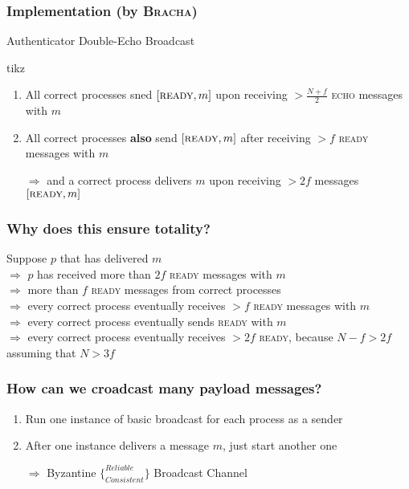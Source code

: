 \documentclass{article}
\begin{document}
\begin{adjustwidth}{2em}{2em}
\begin{adjustwidth}{2em}{2em}
			\subsubsection{Implementation (by \textsc{Bracha})}
			\begin{adjustwidth}{2em}{}
				Authenticator Double-Echo Broadcast
				\begin{center}
					tikz
				\end{center}
				\begin{enumerate}[-]
					\item All correct processes sned $[\textsc{ready}, m]$ upon receiving $> \frac{N+f}{2}$ \textsc{echo} messages with $m$
					\item All correct processes \textbf{also} send $[\textsc{ready}, m]$ after receiving $> f$ \textsc{ready} messages with $m$
					\item[$\Rightarrow$] and a correct process delivers $m$ upon receiving $> 2f$ messages $[\textsc{ready}, m]$
				\end{enumerate}
			\end{adjustwidth}
			\subsubsection{Why does this ensure totality?}
			\begin{adjustwidth}{2em}{}
				Suppose $p$ that has delivered $m$ \\
				$\Rightarrow$ $p$ has received more than $2f$ \textsc{ready} messages with $m$ \\
				$\Rightarrow$ more than $f$ \textsc{ready} messages from correct processes \\
				$\Rightarrow$ every correct process eventually receives $>f$ \textsc{ready} messages with $m$ \\
				$\Rightarrow$ every correct process eventually sends \textsc{ready} with $m$ \\
				$\Rightarrow$ every correct process eventually receives $>2f$ \textsc{ready}, because $N-f > 2f$ assuming that $N > 3f$
			\end{adjustwidth}
			\subsubsection{How can we croadcast many payload messages?}
			\begin{adjustwidth}{2em}{}
				\begin{enumerate}[-]
					\item Run one instance of basic broadcast for each process as a sender
					\item After one instance delivers a message $m$, just start another one
					\item[$\Rightarrow$] Byzantine $\lbrace^{\textit{Reliable}}_{\textit{Consistent}} \rbrace$ Broadcast Channel
				\end{enumerate}
			\end{adjustwidth}
		\end{adjustwidth}

\end{adjustwidth}
\end{document}
